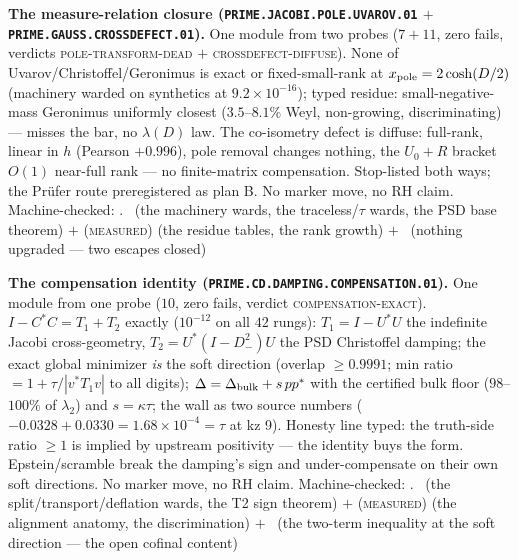 \par\smallskip\noindent\textbf{The measure-relation closure
(\texttt{PRIME.JACOBI.\allowbreak POLE.UVAROV.01} $+$
\texttt{PRIME.GAUSS.\allowbreak CROSSDEFECT.01}).}
One module from two probes ($7 + 11$, zero fails, verdicts
\textsc{pole-transform-dead} $+$ \textsc{crossdefect-diffuse}).
None of Uvarov/Christoffel/Geronimus is exact or
fixed-small-rank at $x_{\rm pole} = 2\cosh(D/2)$ (machinery
warded on synthetics at $9.2\times10^{-16}$); typed residue:
small-negative-mass Geronimus uniformly closest ($3.5$--$8.1\%$
Weyl, non-growing, discriminating) --- misses the bar, no
$\lambda(D)$ law.  The co-isometry defect is diffuse: full-rank,
linear in $h$ (Pearson $+0.996$), pole removal changes nothing,
the $U_0 + R$ bracket $O(1)$ near-full rank --- no finite-matrix
compensation.  Stop-listed both ways; the Pr\"ufer route
preregistered as plan B.  No marker move, no RH claim.
Machine-checked: .
\mE\ (the machinery wards, the traceless/$\tau$ wards, the PSD
base theorem) $+$ (\textsc{measured}) (the residue tables, the
rank growth) $+$ \mO\ (nothing upgraded --- two escapes closed)
\par\smallskip


\par\smallskip\noindent\textbf{The compensation identity
(\texttt{PRIME.CD.\allowbreak DAMPING.COMPENSATION.01}).}
One module from one probe ($10$, zero fails, verdict
\textsc{compensation-exact}).  $I - C^*C = T_1 + T_2$ exactly
($10^{-12}$ on all $42$ rungs): $T_1 = I - U^*U$ the indefinite
Jacobi cross-geometry, $T_2 = U^*(I - D_-^2)U$ the PSD
Christoffel damping; the exact global minimizer \emph{is} the
soft direction (overlap $\ge 0.9991$; min ratio $= 1 +
\tau/|v^*T_1v|$ to all digits); $\Delta = \Delta_{\rm bulk} +
s\,pp^*$ with the certified bulk floor ($98$--$100\%$ of
$\lambda_2$) and $s = \kappa\tau$; the wall as two source
numbers ($-0.0328 + 0.0330 = 1.68\times10^{-4} = \tau$ at kz 9).
Honesty line typed: the truth-side ratio $\ge 1$ is implied by
upstream positivity --- the identity buys the form.
Epstein/scramble break the damping's sign and under-compensate
on their own soft directions.  No marker move, no RH claim.
Machine-checked: .
\mE\ (the split/transport/deflation wards, the T2 sign theorem)
$+$ (\textsc{measured}) (the alignment anatomy, the
discrimination) $+$ \mO\ (the two-term inequality at the soft
direction --- the open cofinal content)
\par\smallskip


